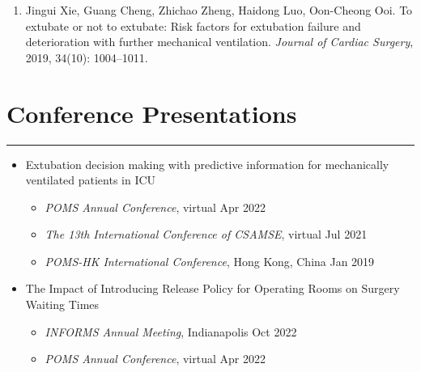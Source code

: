 \documentclass[12pt, a4paper]{article}
\begin{document}
{\begin{enumerate}[leftmargin=36pt, itemsep=6pt, parsep=0.2pt, topsep=1pt]
	\item Jingui Xie, Guang Cheng, Zhichao Zheng, Haidong Luo, Oon-Cheong Ooi. 
	To extubate or not to extubate: Risk factors for extubation failure and deterioration with further mechanical ventilation. 
	{\it Journal of Cardiac Surgery}, 2019, 34(10): 1004–1011. 

\end{enumerate}




\section*{Conference Presentations}
\vspace*{0.4em}
\hrule height 0.5pt
\begin{itemize}[leftmargin=36pt, itemsep=8pt, parsep=0.2pt, topsep=1pt]

	\item Extubation decision making with predictive information for mechanically ventilated patients in ICU

	\begin{itemize}[leftmargin=20pt, itemsep=4pt, topsep=2pt]

		\item {\it POMS Annual Conference}, virtual \hfill Apr 2022

		\item {\it The 13th International Conference of CSAMSE}, virtual \hfill Jul 2021

		\item {\it POMS-HK International Conference}, Hong Kong, China \hfill Jan 2019
		
	\end{itemize}

	\item The Impact of Introducing Release Policy for Operating Rooms on Surgery Waiting Times

	\begin{itemize}[leftmargin=20pt, itemsep=2pt, topsep=2pt]
		
		\item {\it INFORMS Annual Meeting}, Indianapolis \hfill Oct 2022

		\item {\it POMS Annual Conference}, virtual \hfill Apr 2022


\end{itemize}
\end{itemize}}
\end{document}
